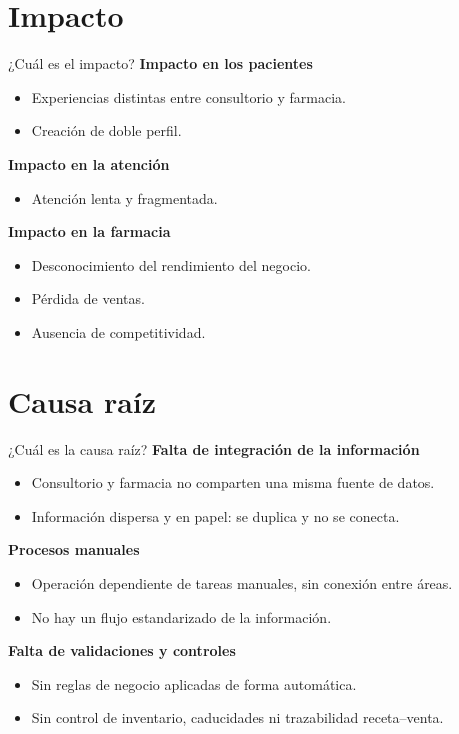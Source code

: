 \documentclass[aspectratio=169,11pt]{beamer}
\begin{document}
\section{Impacto}
\begin{frame}{¿Cuál es el impacto?}
  \textbf{Impacto en los pacientes}
  \begin{itemize}
    \item Experiencias distintas entre consultorio y farmacia.
    \item Creación de doble perfil.
  \end{itemize}
  \vspace{0.3em}
  \textbf{Impacto en la atención}
  \begin{itemize}
    \item Atención lenta y fragmentada.
  \end{itemize}
  \vspace{0.3em}
  \textbf{Impacto en la farmacia}
  \begin{itemize}
    \item Desconocimiento del rendimiento del negocio.
    \item Pérdida de ventas.
    \item Ausencia de competitividad.
  \end{itemize}
\end{frame}

\section{Causa raíz}
\begin{frame}{¿Cuál es la causa raíz?}
  \textbf{Falta de integración de la información}
  \begin{itemize}
    \item Consultorio y farmacia no comparten una misma fuente de datos.
    \item Información dispersa y en papel: se duplica y no se conecta.
  \end{itemize}
  \vspace{0.3em}
  \textbf{Procesos manuales}
  \begin{itemize}
    \item Operación dependiente de tareas manuales, sin conexión entre áreas.
    \item No hay un flujo estandarizado de la información.
  \end{itemize}
  \vspace{0.3em}
  \textbf{Falta de validaciones y controles}
  \begin{itemize}
    \item Sin reglas de negocio aplicadas de forma automática.
    \item Sin control de inventario, caducidades ni trazabilidad receta--venta.
  \end{itemize}
\end{frame}
\end{document}

